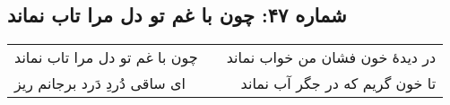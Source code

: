 \begin{center}
\section*{شماره ۴۷: چون با غم تو دل مرا تاب نماند}
\label{sec:047}
\begin{longtable}{l p{0.5cm} r}
چون با غم تو دل مرا تاب نماند
&&
در دیدهٔ خون فشان من خواب نماند
\\
ای ساقی دُردِ دَرد برجانم ریز
&&
تا خون گریم که در جگر آب نماند
\\
\end{longtable}
\end{center}
